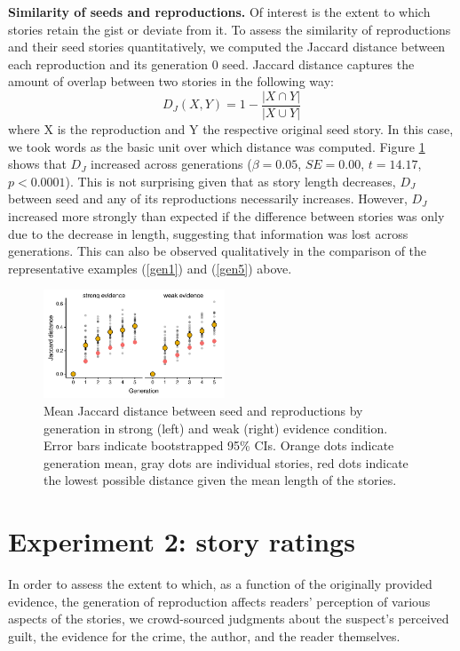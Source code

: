 \documentclass[10pt,letterpaper]{article}
\begin{document}
\textbf{Similarity of seeds and reproductions.} Of interest is the extent to which stories retain the gist or deviate from it. To assess the similarity of reproductions and their seed stories quantitatively, we computed the Jaccard distance between each reproduction and its generation 0 seed. Jaccard distance captures the amount of overlap between two stories in the following way: \[D_J(X,Y) = 1 - \frac{|X \cap Y|}{|X \cup Y|}\] where X is the reproduction and Y the respective original seed story. In this case, we took words as the basic unit over which distance was computed. Figure \ref{fig:jaccdistance} shows that $D_J$ increased across generations ($\beta = 0.05$, $SE = 0.00$, $t = 14.17$, $p < 0.0001$). This is not surprising given that as story length decreases, $D_J$ between seed and any of its reproductions necessarily increases. However, $D_J$ increased more strongly than expected if the difference between stories was only due to the decrease in length, suggesting that information was lost across generations. This can also be observed qualitatively in the comparison of the representative examples (\ref{gen1}) and (\ref{gen5}) above.

\begin{figure}[]
	\includegraphics[width=0.48\textwidth]{graphs/jaccdistance.pdf}
	\caption{Mean Jaccard distance between seed and reproductions by generation in strong (left) and weak (right) evidence condition. Error bars indicate bootstrapped 95\% CIs. Orange dots indicate generation mean, gray dots are individual stories, red dots indicate the lowest possible distance given the mean length of the stories.} 
	\label{fig:jaccdistance}
\end{figure}

\section{Experiment 2: story ratings}
In order to assess the extent to which, as a function of the originally provided evidence, the generation of reproduction affects readers' perception of various aspects of the stories, we crowd-sourced judgments about the suspect's perceived guilt, the evidence for the crime, the author, and the reader themselves.
\end{document}
